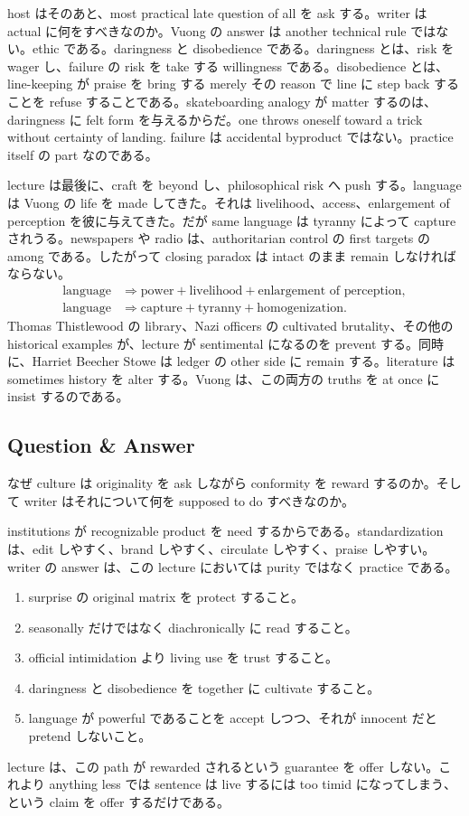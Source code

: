 host はそのあと、most practical late question of all を ask する。writer は actual に何をすべきなのか。Vuong の answer は another technical rule ではない。ethic である。daringness と disobedience である。daringness とは、risk を wager し、failure の risk を take する willingness である。disobedience とは、line-keeping が praise を bring する merely その reason で line に step back することを refuse することである。skateboarding analogy が matter するのは、daringness に felt form を与えるからだ。one throws oneself toward a trick without certainty of landing. failure は accidental byproduct ではない。practice itself の part なのである。

lecture は最後に、craft を beyond し、philosophical risk へ push する。language は Vuong の life を made してきた。それは livelihood、access、enlargement of perception を彼に与えてきた。だが same language は tyranny によって capture されうる。newspapers や radio は、authoritarian control の first targets の among である。したがって closing paradox は intact のまま remain しなければならない。
\begin{align}
\text{language} &\Longrightarrow \text{power} + \text{livelihood} + \text{enlargement of perception},\\
\text{language} &\Longrightarrow \text{capture} + \text{tyranny} + \text{homogenization}.
\end{align}
Thomas Thistlewood の library、Nazi officers の cultivated brutality、その他の historical examples が、lecture が sentimental になるのを prevent する。同時に、Harriet Beecher Stowe は ledger の other side に remain する。literature は sometimes history を alter する。Vuong は、この両方の truths を at once に insist するのである。

\subsection{Question \& Answer}

なぜ culture は originality を ask しながら conformity を reward するのか。そして writer はそれについて何を supposed to do すべきなのか。

institutions が recognizable product を need するからである。standardization は、edit しやすく、brand しやすく、circulate しやすく、praise しやすい。writer の answer は、この lecture においては purity ではなく practice である。
\begin{enumerate}
\item surprise の original matrix を protect すること。
\item seasonally だけではなく diachronically に read すること。
\item official intimidation より living use を trust すること。
\item daringness と disobedience を together に cultivate すること。
\item language が powerful であることを accept しつつ、それが innocent だと pretend しないこと。
\end{enumerate}
lecture は、この path が rewarded されるという guarantee を offer しない。これより anything less では sentence は live するには too timid になってしまう、という claim を offer するだけである。

